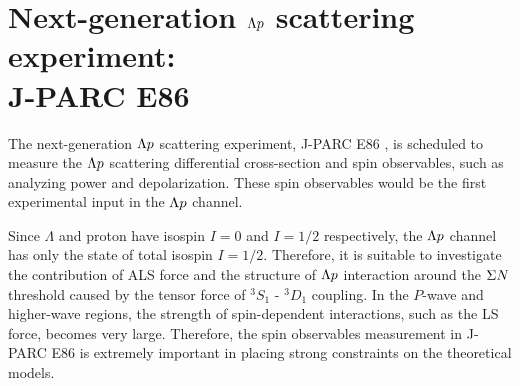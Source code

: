 \section{Next-generation $\Lambda p$ scattering experiment: \\J-PARC E86}
The next-generation $\Lambda p$ scattering experiment, J-PARC E86 \cite{Miwa-LpProp}, is scheduled to measure the $\Lambda p$ scattering differential cross-section and spin observables, such as analyzing power and depolarization. These spin observables would be the first experimental input in the $\Lambda p$ channel. %

Since $\Lambda$ and proton have isospin $I = 0$ and $I = 1/2$ respectively, the $\Lambda p$ channel has only the state of total isospin $I = 1/2$. Therefore, it is suitable to investigate the contribution of ALS force and the structure of $\Lambda p$ interaction around the $\Sigma N$ threshold caused by the tensor force of $^3S_1$ - $^3D_1$ coupling. %
In the $P$-wave and higher-wave regions, the strength of spin-dependent interactions, such as the LS force, becomes very large. Therefore, the spin observables measurement in J-PARC E86 is extremely important in placing strong constraints on the theoretical models. 


